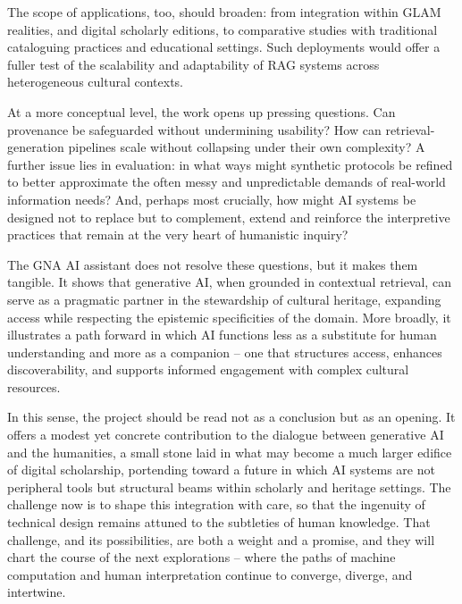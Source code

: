 \begin{spacing}{1.5}
The scope of applications, too, should broaden: from integration within GLAM realities, and digital scholarly editions, to comparative studies with traditional cataloguing practices and educational settings. Such deployments would offer a fuller test of the scalability and adaptability of RAG systems across heterogeneous cultural contexts.

At a more conceptual level, the work opens up pressing questions. Can provenance be safeguarded without undermining usability? How can retrieval-generation pipelines scale without collapsing under their own complexity? A further issue lies in evaluation: in what ways might synthetic protocols be refined to better approximate the often messy and unpredictable demands of real-world information needs? And, perhaps most crucially, how might AI systems be designed not to replace but to complement, extend and reinforce the interpretive practices that remain at the very heart of humanistic inquiry?

The GNA AI assistant does not resolve these questions, but it makes them tangible. It shows that generative AI, when grounded in contextual retrieval, can serve as a pragmatic partner in the stewardship of cultural heritage, expanding access while respecting the epistemic specificities of the domain. More broadly, it illustrates a path forward in which AI functions less as a substitute for human understanding and more as a companion -- one that structures access, enhances discoverability, and supports informed engagement with complex cultural resources.

In this sense, the project should be read not as a conclusion but as an opening. It offers a modest yet concrete contribution to the dialogue between generative AI and the humanities, a small stone laid in what may become a much larger edifice of digital scholarship, portending toward a future in which AI systems are not peripheral tools but structural beams within scholarly and heritage settings. The challenge now is to shape this integration with care, so that the ingenuity of technical design remains attuned to the subtleties of human knowledge. That challenge, and its possibilities, are both a weight and a promise, and they will chart the course of the next explorations -- where the paths of machine computation and human interpretation continue to converge, diverge, and intertwine.


\end{spacing}